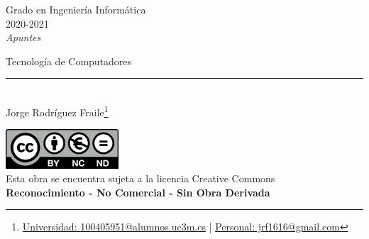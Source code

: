 \documentclass[12pt, twoside, openright]{report} %
\begin{document}
	
\begin{titlepage}
	\begin{sffamily}
	\color{azulUC3M}
	\begin{center}
		\begin{figure}[H] %
		\end{figure}
		\vspace{2.5cm}
		\begin{Large}
			Grado en Ingeniería Informática\\			
			2020-2021\\
			\vspace{2cm}		
			\textsl{Apuntes}\\
			\bigskip
		\end{Large}
		 	{\Huge Tecnología de Computadores}\\
		 	\vspace*{0.5cm}
	 		\rule{10.5cm}{0.1mm}\\
			\vspace*{0.9cm}
			{\LARGE Jorge Rodríguez Fraile\footnote{\href{mailto:100405951@alumnos.uc3m.es}{Universidad: 100405951@alumnos.uc3m.es}  |  \href{mailto:jrf1616@gmail.com}{Personal: jrf1616@gmail.com}}}\\ 
			\vspace*{1cm}
	\end{center}
	\vfill
	\color{black}
		\includegraphics[width=4.2cm]{img/creativecommons.png}\\
		Esta obra se encuentra sujeta a la licencia Creative Commons\\ \textbf{Reconocimiento - No Comercial - Sin Obra Derivada}
	\end{sffamily}
\end{titlepage}


\tableofcontents
\thispagestyle{fancy}
\end{document}
